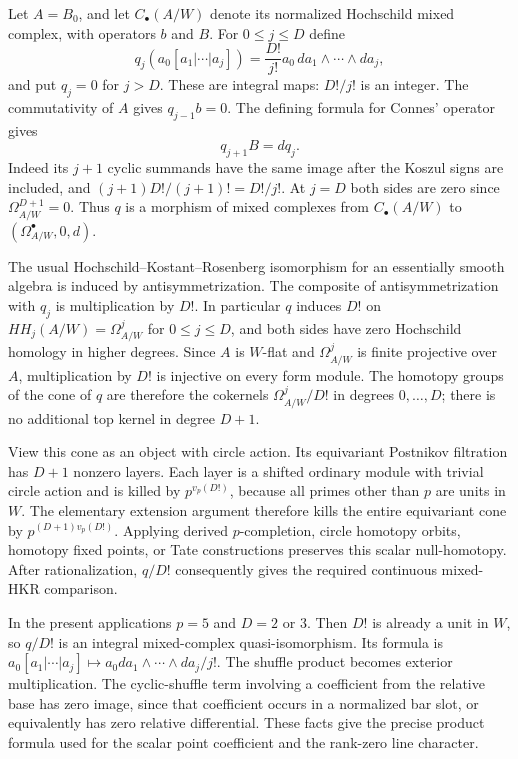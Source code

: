 
Let $A=B_0$, and let $C_\bullet(A/W)$ denote its normalized
Hochschild mixed complex, with operators $b$ and $B$.
For $0\leq j\leq D$ define
\[
 q_j(a_0[a_1|\cdots|a_j])
   =\frac{D!}{j!}a_0\,da_1\wedge\cdots\wedge da_j,
\]
and put $q_j=0$ for $j>D$. These are integral maps: $D!/j!$ is
an integer. The commutativity of $A$ gives $q_{j-1}b=0$.
The defining formula for Connes' operator gives
\[
 q_{j+1}B=dq_j.
\]
Indeed its $j+1$ cyclic summands have the same image after the
Koszul signs are included, and
$(j+1)D!/(j+1)!=D!/j!$. At $j=D$ both sides are zero since
$\Omega^{D+1}_{A/W}=0$. Thus $q$ is a morphism of mixed
complexes from $C_\bullet(A/W)$ to
$(\Omega^\bullet_{A/W},0,d)$.

The usual Hochschild--Kostant--Rosenberg isomorphism for an
essentially smooth algebra is induced by antisymmetrization.
The composite of antisymmetrization with $q_j$ is multiplication
by $D!$. In particular $q$ induces $D!$ on
$HH_j(A/W)=\Omega^j_{A/W}$ for $0\leq j\leq D$, and both sides
have zero Hochschild homology in higher degrees. Since $A$ is
$W$-flat and $\Omega^j_{A/W}$ is finite projective over $A$,
multiplication by $D!$ is injective on every form module.
The homotopy groups of the cone of $q$ are therefore the
cokernels $\Omega^j_{A/W}/D!$ in degrees $0,\ldots,D$;
there is no additional top kernel in degree $D+1$.

View this cone as an object with circle action. Its equivariant
Postnikov filtration has $D+1$ nonzero layers. Each layer is a
shifted ordinary module with trivial circle action and is killed
by $p^{v_p(D!)}$, because all primes other than $p$ are units in
$W$. The elementary extension argument therefore kills the
entire equivariant cone by $p^{(D+1)v_p(D!)}$. Applying derived
$p$-completion, circle homotopy orbits, homotopy fixed points,
or Tate constructions preserves this scalar null-homotopy.
After rationalization, $q/D!$ consequently gives the required
continuous mixed-HKR comparison.

In the present applications $p=5$ and $D=2$ or $3$.
Then $D!$ is already a unit in $W$, so $q/D!$ is an integral
mixed-complex quasi-isomorphism. Its formula is
$a_0[a_1|\cdots|a_j]\mapsto a_0da_1\wedge\cdots\wedge da_j/j!$.
The shuffle product becomes exterior multiplication. The
cyclic-shuffle term involving a coefficient from the relative
base has zero image, since that coefficient occurs in a
normalized bar slot, or equivalently has zero relative
differential. These facts give the precise product formula
used for the scalar point coefficient and the rank-zero line
character.

